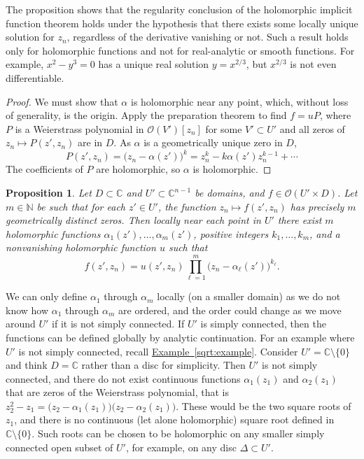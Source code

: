 \documentclass[12pt,openany]{book}
\newcommand{\C}{{\mathbb{C}}}
\newcommand{\N}{{\mathbb{N}}}
\newcommand{\sO}{{\mathscr{O}}}
\theoremstyle{plain}
\newtheorem{prop}[thm]{Proposition}
\theoremstyle{remark}
\theoremstyle{definition}
\theoremstyle{exercise}
\theoremstyle{example}
\newcommand{\exampleref}[1]{\hyperref[#1]{Example~\ref*{#1}}}
\begin{document}
The proposition shows that the regularity conclusion of the
holomorphic implicit function theorem holds under the hypothesis that there exists some locally
unique solution for $z_n$, regardless of the derivative vanishing or not.
Such a result holds only for holomorphic
functions and not for real-analytic or smooth functions.  For example, $x^2-y^3 = 0$ has a
unique real solution $y = x^{2/3}$, but $x^{2/3}$ is not even
differentiable.

\begin{proof}
We must show that $\alpha$
is holomorphic near any point, which, without loss
of generality, is the origin.
Apply the preparation
theorem to find $f = u P$,
where $P$ is a
Weierstrass polynomial in $\sO(V')[z_n]$ for some $V' \subset U'$
and all zeros of $z_n \mapsto P(z',z_n)$ are in $D$.
As $\alpha$ is a geometrically unique zero in $D$,
\begin{equation*}
P(z',z_n) = {\bigl(z_n-\alpha(z') \bigr)}^k = z_n^k - k \alpha(z') z_n^{k-1}
+ \cdots
\end{equation*}
The coefficients of $P$ are holomorphic, so $\alpha$ is holomorphic.
\end{proof}

\begin{prop} \label{prop:zeroshol}
Let $D \subset \C$ and $U' \subset \C^{n-1}$
be domains,
and
$f \in \sO(U' \times D)$.
Let $m \in \N$ be such that
for each $z' \in U'$, the function $z_n \mapsto f(z',z_n)$ has
precisely $m$ geometrically distinct zeros.
Then locally near each point in $U'$ there exist $m$ holomorphic functions
$\alpha_1(z'),\ldots,\alpha_m(z')$,
positive integers
$k_1,\ldots,k_m$,
and a nonvanishing holomorphic function $u$
such that
\begin{equation*}
f(z',z_n) = u(z',z_n) \prod_{\ell=1}^m {\bigl( z_n - \alpha_\ell(z')
\bigr)}^{k_\ell}
.
\end{equation*}
\end{prop}

We can only define $\alpha_1$ through $\alpha_m$ locally (on a
smaller domain) as we do not know
how $\alpha_1$ through $\alpha_m$ are ordered, and the order could change
as we move around
$U'$ if it is not simply connected.  If $U'$ is simply connected, then
the functions can be defined globally by analytic continuation.
For an example where $U'$ is not simply connected,
recall \exampleref{sqrt:example}. Consider $U' = \C \setminus \{ 0 \}$ and
think $D=\C$ rather than a disc for simplicity.  Then $U'$ is not simply
connected, and there do not exist continuous functions
$\alpha_1(z_1)$ and
$\alpha_2(z_1)$ that are zeros
of the Weierstrass polynomial, that is
$z_2^2 - z_1 =
\bigl(z_2-\alpha_1(z_1) \bigr)
\bigl(z_2-\alpha_2(z_1) \bigr)$.
These would be the two square roots of $z_1$, and there is no continuous
(let alone holomorphic) square root defined in $\C \setminus \{ 0 \}$.
Such roots can be chosen to be holomorphic on any smaller
simply connected open subset of $U'$, for
example, on any disc $\Delta \subset U'$.
\end{document}
